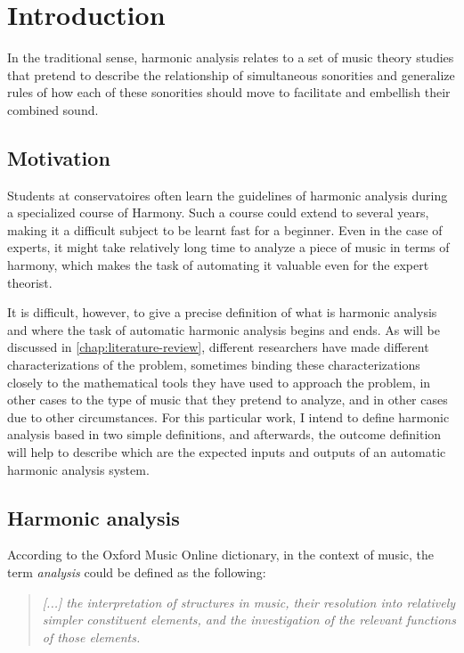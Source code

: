 \chapter{Introduction}
\label{chap:introduction}
In the traditional sense, harmonic analysis relates to a set of music theory studies that pretend to describe the relationship of simultaneous sonorities and generalize rules of how each of these sonorities should move to facilitate and embellish their combined sound.

\section{Motivation}
Students at conservatoires often learn the guidelines of harmonic analysis during a specialized course of Harmony. Such a course could extend to several years, making it a difficult subject to be learnt fast for a beginner. Even in the case of experts, it might take relatively long time to analyze a piece of music in terms of harmony, which makes the task of automating it valuable even for the expert theorist.


It is difficult, however, to give a precise definition of what is harmonic analysis and where the task of automatic harmonic analysis begins and ends. As will be discussed in \autoref{chap:literature-review}, different researchers have made different characterizations of the problem, sometimes binding these characterizations closely to the mathematical tools they have used to approach the problem, in other cases to the type of music that they pretend to analyze, and in other cases due to other circumstances. For this particular work, I intend to define harmonic analysis based in two simple definitions, and afterwards, the outcome definition will help to describe which are the expected inputs and outputs of an automatic harmonic analysis system.

\section{Harmonic analysis}
According to the Oxford Music Online dictionary, in the context of music, the term \emph{analysis} could be defined as the following: \cite{oxfordanalysis}

\begin{quote}
\centering
\emph{[...] the interpretation of structures in music, \linebreak
their resolution into relatively simpler constituent elements, \linebreak and the investigation of the relevant functions of those elements.}
\end{quote}

